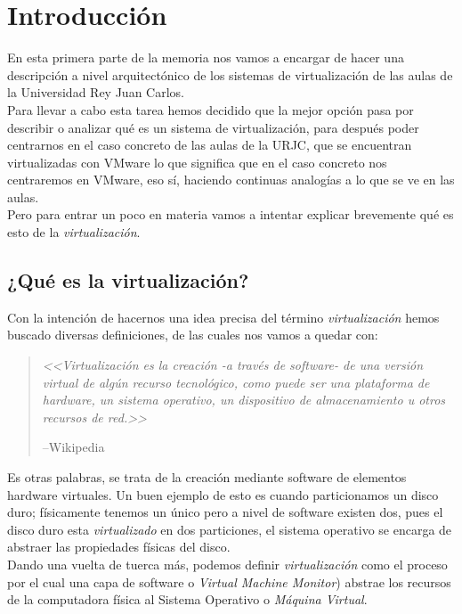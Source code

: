 \chapter{Introducción}
\lettrine[lines=1,slope=4pt,findent=0pt]{E}{}n esta primera parte de la memoria nos vamos a encargar de hacer una descripción a nivel arquitectónico de los sistemas de virtualización de las aulas de la Universidad Rey Juan Carlos.\\

\noindent Para llevar a cabo esta tarea hemos decidido que la mejor opción pasa por describir o analizar qué es un sistema de virtualización, para después poder centrarnos en el caso concreto de las aulas de la URJC, que se encuentran virtualizadas con VMware\cite{vmware} lo que significa que en el caso concreto nos centraremos en VMware, eso sí, haciendo continuas analogías a lo que se ve en las aulas.\\

\noindent Pero para entrar un poco en materia vamos a intentar explicar brevemente qué es esto de la \emph{virtualización}.

\section{¿Qué es la virtualización?}
\noindent Con la intención de hacernos una idea precisa del término \emph{virtualización} hemos buscado diversas definiciones, de las cuales nos vamos a quedar con:
\begin{quote}
\emph{<<Virtualización es la creación -a través de software- de una versión virtual de algún recurso tecnológico, como puede ser una plataforma de hardware, un sistema operativo, un dispositivo de almacenamiento u otros recursos de red.>>}
\begin{flushright}
--Wikipedia\cite{defvirwiki}
\end{flushright}
\end{quote}

\noindent Es otras palabras, se trata de la creación mediante software de elementos hardware virtuales. Un buen ejemplo de esto es cuando particionamos un disco duro; físicamente tenemos un único  pero a nivel de software existen dos, pues el disco duro esta \emph{virtualizado} en dos particiones, el sistema operativo se encarga de abstraer las propiedades físicas del disco.\\

\noindent Dando una vuelta de tuerca más, podemos definir \emph{virtualización} como el proceso por el cual una capa de software  o \emph{Virtual Machine Monitor}) abstrae los recursos de la computadora física al Sistema Operativo o \emph{Máquina Virtual}.\\

